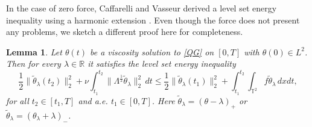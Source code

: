 \documentclass{amsart}
\numberwithin{Theorem}{section}
\newtheorem {Lemma}[Theorem]  {Lemma}
\theoremstyle{definition}
\theoremstyle{remark}
\renewcommand{\th}{\theta}
\begin{document}
In the case of zero force, Caffarelli and Vasseur derived a level set energy inequality using a harmonic extension \cite{CaV}. Even though the force does not present any problems, we sketch a different proof here for completeness.

\begin{Lemma}
\label{le:existence}
Let $\th(t)$ be a viscosity solution to \eqref{QG} on $[0,T]$ with $\th(0) \in L^2$. Then
for every $\lambda \in \mathbb{R}$ it satisfies the level set energy inequality
\begin{equation}\label{truncated}
\frac{1}{2}\|\tilde\theta_\lambda(t_2)\|_2^2+\nu\int_{t_1}^{t_2}\|\Lambda ^{\frac{1}{2}}\tilde\theta_\lambda\|_2^2 \, dt
\leq \frac{1}{2}\|\tilde\theta_\lambda(t_1)\|_2^2+\int_{t_1}^{t_2}\int_{\mathbb T^2}f\tilde\theta_\lambda \, dxdt,
\end{equation}
for all $t_2\in[t_1, T]$ and a.e. $t_1\in [0,T]$. Here $\tilde\theta_\lambda=(\theta-\lambda)_+$ or $\tilde\theta_\lambda=(\theta_\lambda+\lambda)_{-}$.
\end{Lemma}
\end{document}
